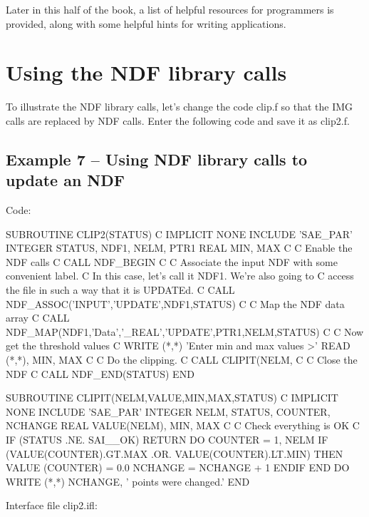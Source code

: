 \documentclass[11pt,nolof]{starlink}
\begin{document}
Later in this half of the book, a list of helpful resources for
programmers is provided, along with some helpful hints for
writing applications.

\newpage

\section{Using the NDF library calls}

To illustrate the NDF library calls, let's change the code \textsf{clip.f} so
that the \textsf{IMG} calls are replaced by \textsf{NDF} calls. Enter the
following code and save it as \textsf{clip2.f}.

\subsection{Example 7 -- Using NDF library calls to update an NDF}

Code:

\begin{small}
\begin{terminalv}
      SUBROUTINE CLIP2(STATUS)
C
      IMPLICIT NONE
      INCLUDE 'SAE_PAR'
      INTEGER STATUS, NDF1, NELM, PTR1
      REAL MIN, MAX
C
C Enable the NDF calls
C
      CALL NDF_BEGIN
C
C Associate the input NDF with some convenient label.
C In this case, let's call it NDF1. We're also going to
C access the file in such a way that it is UPDATEd.
C
      CALL NDF_ASSOC('INPUT','UPDATE',NDF1,STATUS)
C
C Map the NDF data array
C
      CALL NDF_MAP(NDF1,'Data','_REAL','UPDATE',PTR1,NELM,STATUS)
C
C Now get the threshold values
C
      WRITE (*,*) 'Enter min and max values >'
      READ (*,*), MIN, MAX
C
C Do the clipping.
C
      CALL CLIPIT(NELM,%
C
C Close the NDF
C
      CALL NDF_END(STATUS)
      END

      SUBROUTINE CLIPIT(NELM,VALUE,MIN,MAX,STATUS)
C
      IMPLICIT NONE
      INCLUDE 'SAE_PAR'
      INTEGER NELM, STATUS, COUNTER, NCHANGE
      REAL VALUE(NELM), MIN, MAX
C
C Check everything is OK
C
      IF (STATUS .NE. SAI__OK) RETURN
      DO COUNTER = 1, NELM
        IF (VALUE(COUNTER).GT.MAX .OR. VALUE(COUNTER).LT.MIN) THEN
        VALUE (COUNTER) = 0.0
        NCHANGE = NCHANGE + 1
        ENDIF
      END DO
      WRITE (*,*) NCHANGE, ' points were changed.'
      END
\end{terminalv}
\end{small}

Interface file \textsf{clip2.ifl}:
\end{document}
